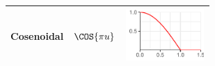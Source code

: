 \begin{SidewaysTable}
{\begin{tabular*}{\textwidth}{lll}
Cosenoidal &
$\displaystyle 
\COS{\pi u}
$
& \includegraphics[width=3cm,height=2cm]{./img_ventanas/ventana_cosenoidal.pdf}
\\
\bottomrule
\end{tabular*}
}
\label{ventanas}
\end{SidewaysTable}

